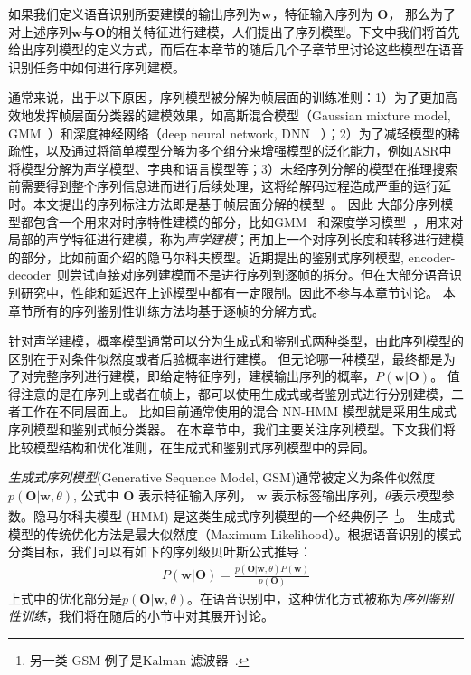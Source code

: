 如果我们定义语音识别所要建模的输出序列为$\mathbf w$，特征输入序列为 ${\mathbf O}$，
那么为了对上述序列$\mathbf w$与${\mathbf O}$的相关特征进行建模，人们提出了序列模型。下文中我们将首先给出序列模型的定义方式，而后在本章节的随后几个子章节里讨论这些模型在语音识别任务中如何进行序列建模。

通常来说，出于以下原因，序列模型被分解为帧层面的训练准则：1）为了更加高效地发挥帧层面分类器的建模效果，如高斯混合模型（Gaussian mixture model, GMM~\cite{woodland1994large}）和深度神经网络（deep neural network, DNN ~\cite{hinton2012deep}）；2）为了减轻模型的稀疏性，以及通过将简单模型分解为多个组分来增强模型的泛化能力，例如ASR中将模型分解为声学模型、字典和语言模型等；3）未经序列分解的模型在推理搜索前需要得到整个序列信息进而进行后续处理，这将给解码过程造成严重的运行延时。本文提出的序列标注方法即是基于帧层面分解的模型~\cite{forney1973viterbi,mohri2002weighted}。
因此
大部分序列模型都包含一个用来对时序特性建模的部分，比如GMM~\cite{woodland1994large} 和深度学习模型~\cite{hinton2012deep}，用来对局部的声学特征进行建模，称为{\em 声学建模}；再加上一个对序列长度和转移进行建模的部分，比如前面介绍的隐马尔科夫模型。近期提出的鉴别式序列模型, encoder-decoder~\cite{chan2016end}则尝试直接对序列建模而不是进行序列到逐帧的拆分。但在大部分语音识别研究中，性能和延迟在上述模型中都有一定限制。因此不参与本章节讨论。
本章节所有的序列鉴别性训练方法均基于逐帧的分解方式。

针对声学建模，概率模型通常可以分为生成式和鉴别式两种类型，由此序列模型的区别在于对条件似然度或者后验概率进行建模。
但无论哪一种模型，最终都是为了对完整序列进行建模，即给定特征序列，建模输出序列的概率，$P(\mathbf{w}|\mathbf{O})$。
值得注意的是在序列上或者在帧上，都可以使用生成式或者鉴别式进行分别建模，二者工作在不同层面上。
比如目前通常使用的混合 NN-HMM 模型就是采用生成式序列模型和鉴别式帧分类器。
在本章节中，我们主要关注序列模型。下文我们将比较模型结构和优化准则，在生成式和鉴别式序列模型中的异同。


{\em 生成式序列模型}(Generative Sequence Model, GSM)通常被定义为条件似然度$p(\mathbf{O}|\mathbf{w}, \theta)$, 公式中 ${\mathbf O}$ 表示特征输入序列， $\mathbf w$ 表示标签输出序列，$\theta$表示模型参数。隐马尔科夫模型 (HMM) 是这类生成式序列模型的一个经典例子~\footnote{另一类 GSM 例子是Kalman 滤波器~\cite{digalakis1991dynamical,abbeel2005discriminative}.}。
生成式模型的传统优化方法是最大似然度（Maximum Likelihood）。根据语音识别的模式分类目标，我们可以有如下的序列级贝叶斯公式推导：
\begin{equation}
\begin{split}
P(\mathbf{w}|\mathbf{O})=\frac {p(\mathbf{O}|\mathbf{w},\theta)P(\mathbf{w})}{p(\mathbf{O})}  
\end{split}
\end{equation}
上式中的优化部分是$p(\mathbf{O}|\mathbf{w},\theta)$。在语音识别中，这种优化方式被称为{\em 序列鉴别性训练}，我们将在随后的小节中对其展开讨论。



